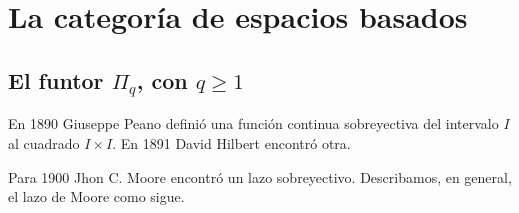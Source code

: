\section{La categoría de espacios basados}

\subsection{El funtor \texorpdfstring{$\Pi_q$}{Pi_1}, con \texorpdfstring{$q\geq1$}{q>1}}
En 1890 Giuseppe Peano definió una función continua sobreyectiva del intervalo $I$ al cuadrado $I\times I$. En 1891 David Hilbert encontró otra.

Para 1900 Jhon C. Moore encontró un lazo sobreyectivo. Describamos, en general, el lazo de Moore como sigue.

